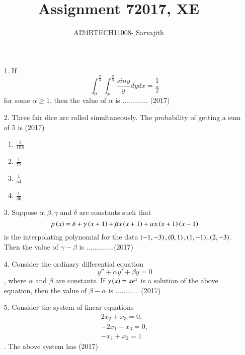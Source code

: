 \documentclass[journal]{IEEEtran}
\begin{document}

\vspace{3cm}


\author{AI24BTECH11008- Sarvajith
}
\title{Assignment 7}
{\let\newpage\relax\maketitle}
\title{2017, XE}
\renewcommand{\thefigure}{\theenumi}
\renewcommand{\thetable}{\theenumi}
\setlength{\intextsep}{10pt} %
\renewcommand{\thetable}{\theenumi}
\begin{enumerate}
    \item[1.] If $$\int_{0}^{\frac{\pi}{\alpha}}\int_{x}^{\frac{\pi}{\alpha}}\frac{siny}{y}dydx = \frac{1}{2}$$ for some $\alpha \geq 1$, then the value of $\alpha$ is ............. \hfill (2017)
    \item[2.] Three fair dice are rolled simultaneously. The probability of getting a sum of 5 is \hfill (2017)
    \begin{enumerate}[label = (\Alph*)]
        \item $\frac{1}{108}$
        \item $\frac{1}{72}$
        \item $\frac{1}{54}$
        \item $\frac{1}{36}$
    \end{enumerate} 
    \item[3.] Suppose $\alpha, \beta, \gamma$ and $\delta$ are constants such that $$p\left(x\right) = \delta + \gamma\left(x+1\right)+\beta x\left(x+1\right) + \alpha x\left(x+1\right)\left(x-1\right)$$ is the interpolating polynomial for the data $\left(-1,-3\right),\left(0,1\right),\left(1,-1\right),\left(2,-3\right)$. Then the value of $\gamma - \beta$ is ..............\hfill (2017)
    \item[4.] Consider the ordinary differential equation $$y'' + \alpha y' + \beta y =0$$, where $\alpha$ and $\beta$ are constants. If $y\left(x\right) = xe^x$ is a solution of the above equation, then the value of $\beta-\alpha$ is .............\hfill (2017)
    \item[5.] Consider the system of linear equations \begin{align*}2x_2 + x_3 =0,\\-2x_1 - x_3=0,\\-x_1 + x_2=1\end{align*}. The above system has \hfill (2017)

\end{enumerate}
\end{document}
